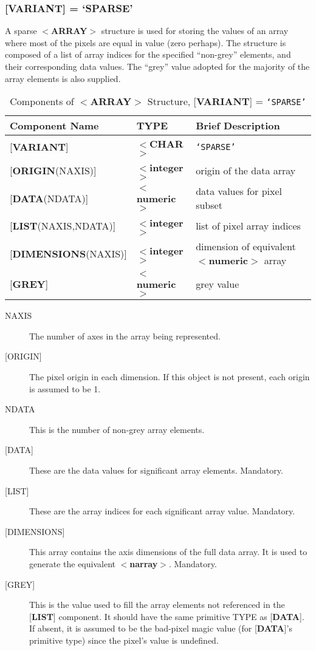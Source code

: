 \documentclass[twoside,11pt]{article}
\renewcommand{\_}{\texttt{\symbol{95}}}
\begin{document}
\subsubsection{{[}{\bf VARIANT}{]} = `SPARSE'}
A sparse \mbox{$<${\bf ARRAY}$>$} structure is used for storing
the values of an array where most of the pixels are equal in value
(zero perhaps).
The structure is composed of a list of array indices for the
specified ``non-grey''
elements, and their corresponding data values.
The ``grey'' value adopted for the majority of the array elements is
also supplied.

\begin{table}[htb]
\centering
\caption{Components of $<${\bf ARRAY}$>$ Structure, {[}{\bf VARIANT}{]} = {\tt `SPARSE'}}
\begin{tabular}{|l|l|l|}
\hline
Component Name & TYPE & Brief Description \\  \hline
{[}{\bf VARIANT}{]} & $<${\bf \_CHAR}$>$ & {\tt `SPARSE'} \\
{[}{\bf ORIGIN}(NAXIS){]} & $<${\bf integer}$>$ & origin of the data array \\
{[}{\bf DATA}(NDATA){]} & $<${\bf numeric}$>$ & data values for pixel subset \\
{[}{\bf LIST}(NAXIS,NDATA){]} & $<${\bf integer}$>$ & list of pixel array indices \\
{[}{\bf DIMENSIONS}(NAXIS){]} & $<${\bf integer}$>$ &
dimension of equivalent $<${\bf numeric}$>$ array \\
{[}{\bf GREY}{]} & $<${\bf numeric}$>$ & grey value \\ \hline
\end{tabular}
\end{table}

\begin{description}
\item [NAXIS]
The number of axes in the array being represented.
\item [{[}ORIGIN{]}]
The pixel origin in each dimension.  If this object is not present,
each origin is assumed to be 1.
\item [NDATA]
This is the number of non-grey array elements.
\item [{[}DATA{]}]
These are the data values for significant array elements.
Mandatory.
\item [{[}LIST{]}]
These are the array indices for each significant array value.
Mandatory.
\item [{[}DIMENSIONS{]}]
This array contains the axis dimensions of the full data array.
It is used to generate the equivalent $<${\bf narray}$>$.
Mandatory.
\item [{[}GREY{]}]
This is the value used to fill the array elements not
referenced in the {[}{\bf LIST}{]} component.  It should
have the same primitive
TYPE as {[}{\bf DATA}{]}.  If absent,
it is assumed to be
the bad-pixel magic value
(for {[}{\bf DATA}{]}'s primitive type) since the pixel's
value is undefined.
\end{description}
\end{document}
